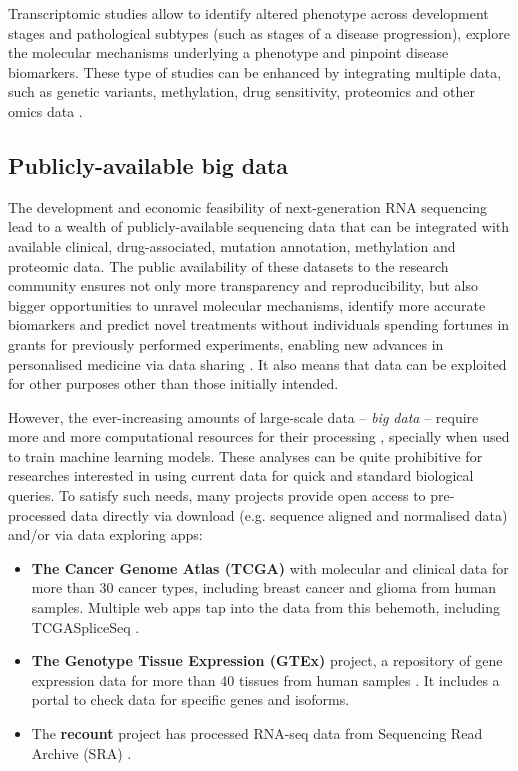 
Transcriptomic studies allow to identify altered phenotype across development stages and pathological subtypes (such as stages of a disease progression), explore the molecular mechanisms underlying a phenotype and pinpoint disease biomarkers. These type of studies can be enhanced by integrating multiple data, such as genetic variants, methylation, drug sensitivity, proteomics and other omics data \cite{}.

\subsection{Publicly-available big data}

The development and economic feasibility of next-generation RNA sequencing lead to a wealth of publicly-available sequencing data that can be integrated with available clinical, drug-associated, mutation annotation, methylation and proteomic data. The public availability of these datasets to the research community ensures not only more transparency and reproducibility, but also bigger opportunities to unravel molecular mechanisms, identify more accurate biomarkers and predict novel treatments without individuals spending fortunes in grants for previously performed experiments, enabling new advances in personalised medicine via data sharing \cite{rockhold:2019ws}. It also means that data can be exploited for other purposes other than those initially intended.

However, the ever-increasing amounts of large-scale data -- \emph{big data} -- require more and more computational resources for their processing \cite{gauthier:2018ws}, specially when used to train machine learning models. These analyses can be quite prohibitive for researches interested in using current data for quick and standard biological queries. To satisfy such needs, many projects provide open access to pre-processed data directly via download (e.g. sequence aligned and normalised data) and/or via data exploring apps:

\begin{itemize}
	\item \textbf{The Cancer Genome Atlas (TCGA)} with molecular and clinical data for more than 30 cancer types, including breast cancer and glioma from human samples. Multiple web apps tap into the data from this behemoth, including TCGASpliceSeq \cite{ryan:2016tm}.
	\item \textbf{The Genotype Tissue Expression (GTEx)} project, a repository of gene expression data for more than 40 tissues from human samples \cite{lonsdale:2013uo}. It includes a portal to check data for specific genes and isoforms.
	\item The \textbf{recount} project has processed RNA-seq data from Sequencing Read Archive (SRA) \cite{collado-torres:2017uw,wilks:2021uc}.
\end{itemize}


